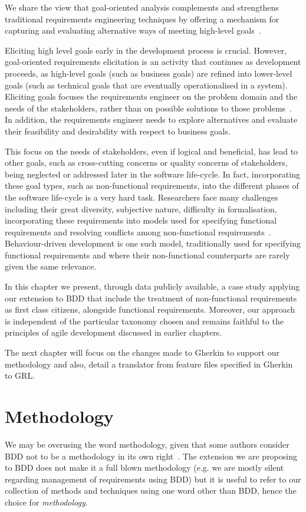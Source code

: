 \documentclass[dissertation,final]{softeng}
\newcommand{\nfrs}{non-functional requirements\xspace}
\begin{document}
We share the view that goal-oriented analysis complements and strengthens traditional requirements engineering techniques by offering a mechanism for capturing and evaluating alternative ways of meeting high-level goals~\citep{MylopoulosExpl2001}.

Eliciting high level goals early in the development process is crucial. However, goal-oriented requirements elicitation is an activity that continues as development proceeds, as high-level goals (such as business goals) are refined into lower-level goals (such as technical goals that are eventually operationalised in a system). Eliciting goals focuses the requirements engineer on the problem domain and the needs of the stakeholders, rather than on possible solutions to those problems~\citep{Nuseibeh:2000ub}. In addition, the requirements engineer needs to explore alternatives and evaluate their feasibility and desirability with respect to business goals.

This focus on the needs of stakeholders, even if logical and beneficial, has lead to other goals, such as cross-cutting concerns or quality concerns of stakeholders, being neglected or addressed later in the software life-cycle. In fact, incorporating these goal types, such as \nfrs, into the different phases of the software life-cycle is a very hard task. Researchers face many challenges including their great diversity,  subjective nature, difficulty in formalisation, incorporating these requirements into models used for specifying functional requirements and resolving conflicts among \nfrs~\citep{Matoussi:2008wr}. Behaviour-driven development is one such model, traditionally used for specifying functional requirements and where their non-functional counterparts are rarely given the same relevance. 

In this chapter we present, through data publicly available, a case study applying our extension to BDD that include the treatment of \nfrs as first class citizens, alongside functional requirements. Moreover, our approach is independent of the particular taxonomy chosen and remains faithful to the principles of agile development discussed in earlier chapters. 

The next chapter will focus on the changes made to Gherkin to support our methodology and also, detail a translator from feature files specified in Gherkin to GRL.

\section{Methodology}
We may be overusing the word methodology, given that some authors consider BDD not to be a methodology in its own right~\citep{Smart201410}. The extension we are proposing to BDD does not make it a full blown methodology (e.g. we are mostly silent regarding management of requirements using BDD) but it is useful to refer to our collection of methods and techniques using one word other than BDD, hence the choice for \emph{methodology}.
\end{document}
